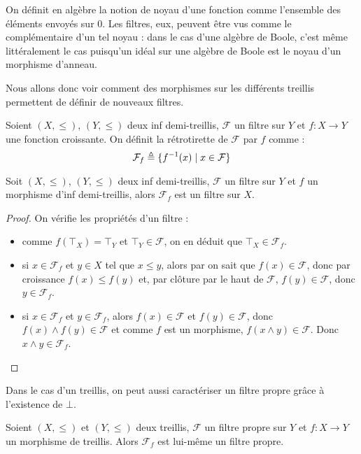 On définit en algèbre la notion de noyau d'une fonction comme l'ensemble des
éléments envoyés sur $0$. Les filtres, eux, peuvent être vus comme le
complémentaire d'un tel noyau : dans le cas d'une algèbre de Boole, c'est même
littéralement le cas puisqu'un idéal sur une algèbre de Boole est le noyau d'un
morphisme d'anneau.

Nous allons donc voir comment des morphismes sur les différents treillis
permettent de définir de nouveaux filtres.

\begin{definition}
  Soient $(X,\leq)$, $(Y,\leq)$ deux inf demi-treillis, $\mathcal F$ un filtre
  sur $Y$ et $f : X \to Y$ une fonction croissante. On définit la rétrotirette de
  $\mathcal F$ par $f$ comme :
  \[\mathcal F_f \triangleq \{f^{-1}(x)\mid x \in \mathcal F\}\]
\end{definition}

\begin{property}
  Soit $(X,\leq)$, $(Y,\leq)$ deux inf demi-treillis, $\mathcal F$ un filtre
  sur $Y$ et $f$ un morphisme d'inf demi-treillis, alors $\mathcal F_f$ est un
  filtre sur $X$.
\end{property}

\begin{proof}
  On vérifie les propriétés d'un filtre :
  \begin{itemize}
  \item comme $f(\top_X) = \top_Y$ et $\top_Y \in \mathcal F$, on en déduit que
    $\top_X\in\mathcal F_f$.
  \item si $x\in \mathcal F_f$ et $y\in X$ tel que $x\leq y$, alors par
    on sait que $f(x)\in\mathcal F$, donc par croissance $f(x)\leq f(y)$ et,
    par clôture par le haut de $\mathcal F$, $f(y)\in \mathcal F$, donc
    $y\in \mathcal F_f$.
  \item si $x\in \mathcal F_f$ et $y\in\mathcal F_f$, alors $f(x)\in\mathcal F$
    et $f(y)\in\mathcal F$, donc $f(x)\land f(y)\in\mathcal F$ et comme
    $f$ est un morphisme, $f(x\land y)\in\mathcal F$. Donc
    $x\land y\in\mathcal F_f$.
  \end{itemize}
\end{proof}

Dans le cas d'un treillis, on peut aussi caractériser un filtre propre grâce à
l'existence de $\bot$.

\begin{property}
  Soient $(X,\leq)$ et $(Y,\leq)$ deux treillis, $\mathcal F$ un filtre propre
  sur $Y$ et $f : X \to Y$ un morphisme de treillis. Alors $\mathcal F_f$ est
  lui-même un filtre propre.
\end{property}

